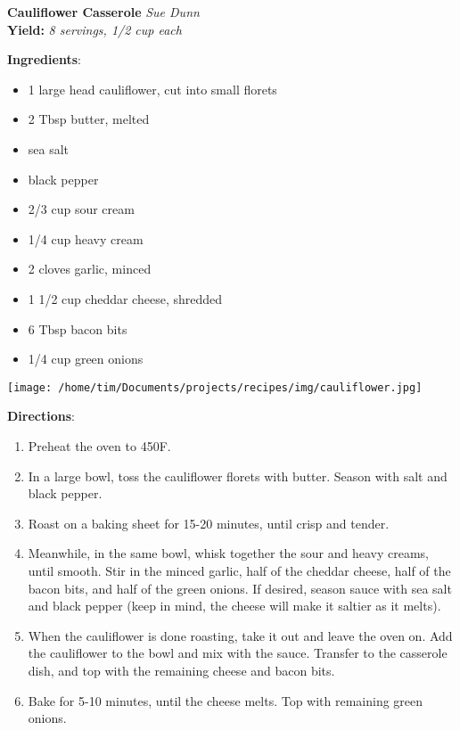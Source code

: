 \documentclass[11pt, twoside, openany]{book}
\begin{document}
\noindent\begin{minipage}[t]{\linewidth}%
{\Large\textbf{Cauliflower Casserole}} \label{cauliflower-casserole}\hfill\textit{Sue Dunn}\\
\textbf{Yield:} \textit{8 servings, 1/2 cup each}\\
\noindent\begin{minipage}[t]{0.78\linewidth}%
\textbf{Ingredients}:\vspace{-3mm}
\begin{multicols}{2}
\begin{itemize}\setlength\itemsep{-1mm}
\item 1 large head cauliflower, cut into small florets
\item 2 Tbsp butter, melted
\item sea salt
\item black pepper
\item 2/3 cup sour cream
\item 1/4 cup heavy cream
\item 2 cloves garlic, minced
\item 1 1/2 cup cheddar cheese, shredded
\item 6 Tbsp bacon bits
\item 1/4 cup green onions
\end{itemize}
\end{multicols}
\end{minipage}
\noindent\begin{minipage}[t]{0.18\linewidth}
\centering \strut\vspace*{-\baselineskip}\newline
\texttt{[image: /home/tim/Documents/projects/recipes/img/cauliflower.jpg]}\\
\end{minipage}\vspace{3mm}
\textbf{Directions}:
\vspace{-3mm}\begin{enumerate}\setlength\itemsep{-1mm}
\item Preheat the oven to 450F.
\item In a large bowl, toss the cauliflower florets with butter. Season with salt and black pepper.
\item Roast on a baking sheet for 15-20 minutes, until crisp and tender.
\item Meanwhile, in the same bowl, whisk together the sour and heavy creams, until smooth. Stir in the minced garlic, half of the cheddar cheese, half of the bacon bits, and half of the green onions. If desired, season sauce with sea salt and black pepper (keep in mind, the cheese will make it saltier as it melts).
\item When the cauliflower is done roasting, take it out and leave the oven on. Add the cauliflower to the bowl and mix with the sauce. Transfer to the casserole dish, and top with the remaining cheese and bacon bits.
\item Bake for 5-10 minutes, until the cheese melts. Top with remaining green onions.
\end{enumerate}
\end{minipage}\vspace{8mm}
\end{document}
